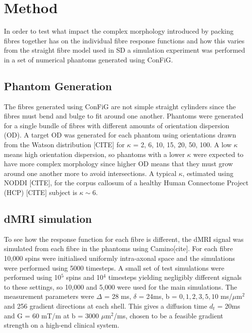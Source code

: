 \section{Method}
In order to test what impact the complex morphology introduced by packing fibres together has on the individual fibre response functions and how this varies from the straight fibre model used in SD a simulation experiment was performed in a set of numerical phantoms generated using ConFiG. 

\subsection{Phantom Generation}
The fibres generated using ConFiG are not simple straight cylinders since the fibres must bend and bulge to fit around one another. Phantoms were generated for a single bundle of fibres with different amounts of orientation dispersion (OD). A target OD was generated for each phantom using orientations drawn from the Watson distribution [CITE] for $\kappa$ = 2, 6, 10, 15, 20, 50, 100.
A low $\kappa$ means high orientation dispersion, so phantoms with a lower $\kappa$ were expected to have more complex morphology since higher OD means that they must grow around one another more to avoid intersections. A typical $\kappa$, estimated using NODDI [CITE], for the corpus callosum of a healthy Human Connectome Project (HCP) [CITE] subject is $\kappa \sim 6$.


\subsection{dMRI simulation}
To see how the response function for each fibre is different, the dMRI signal was simulated from each fibre in the phantoms using Camino[cite]. For each fibre 10,000 spins were initialised uniformly intra-axonal space and the simulations were performed using 5000 timesteps. A small set of test simulations were performed using 10$^5$ spins and 10$^4$ timesteps yielding negligibly different signals to these settings, so 10,000 and 5,000 were used for the main simulations. The measurement parameters were $\Delta$ = 28 ms, $\delta$ = 24ms, b = $0,1,2,3,5,10$ ms/$\mu$m$^2$ and 256 gradient directions at each shell. This gives a diffusion time $d_t$ = 20ms and G = 60 mT/m  at b = 3000 $\mu$m$^2$/ms, chosen to be a feasible gradient strength on a high-end clinical system. 

